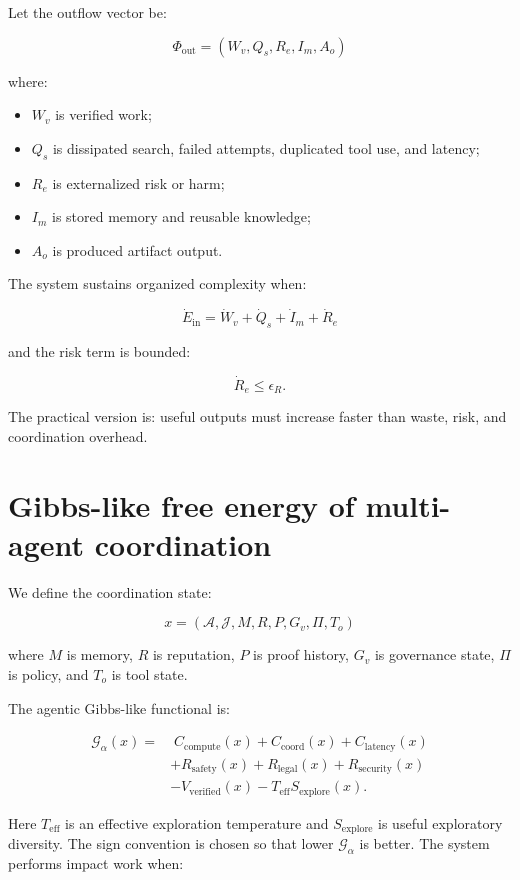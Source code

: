 \documentclass[
  11pt,
]{article}
\providecommand{\tightlist}{%
  \setlength{\itemsep}{0pt}\setlength{\parskip}{0pt}}
\begin{document}
Let the outflow vector be:

\[
\Phi_{\text{out}} =
(W_v,Q_s,R_e,I_m,A_o)
\]

where:

\begin{itemize}
\tightlist
\item
  \(W_v\) is verified work;
\item
  \(Q_s\) is dissipated search, failed attempts, duplicated tool use,
  and latency;
\item
  \(R_e\) is externalized risk or harm;
\item
  \(I_m\) is stored memory and reusable knowledge;
\item
  \(A_o\) is produced artifact output.
\end{itemize}

The system sustains organized complexity when:

\[
\dot{E}_{\text{in}}
=
\dot{W}_v+
\dot{Q}_s+
\dot{I}_m+
\dot{R}_e
\]

and the risk term is bounded:

\[
\dot{R}_e \leq \epsilon_R.
\]

The practical version is: useful outputs must increase faster than
waste, risk, and coordination overhead.

\section{Gibbs-like free energy of multi-agent
coordination}\label{gibbs-like-free-energy-of-multi-agent-coordination}

We define the coordination state:

\[
x=(\mathcal{A},\mathcal{J},M,R,P,G_v,\Pi,T_o)
\]

where \(M\) is memory, \(R\) is reputation, \(P\) is proof history,
\(G_v\) is governance state, \(\Pi\) is policy, and \(T_o\) is tool
state.

The agentic Gibbs-like functional is:

\[
\begin{aligned}
\mathcal{G}_{\alpha}(x)=&\;C_{\text{compute}}(x)+C_{\text{coord}}(x)+C_{\text{latency}}(x) \\
&+R_{\text{safety}}(x)+R_{\text{legal}}(x)+R_{\text{security}}(x) \\
&-V_{\text{verified}}(x)-T_{\text{eff}}S_{\text{explore}}(x).
\end{aligned}
\]

Here \(T_{\text{eff}}\) is an effective exploration temperature and
\(S_{\text{explore}}\) is useful exploratory diversity. The sign
convention is chosen so that lower \(\mathcal{G}_{\alpha}\) is better.
The system performs impact work when:
\end{document}
